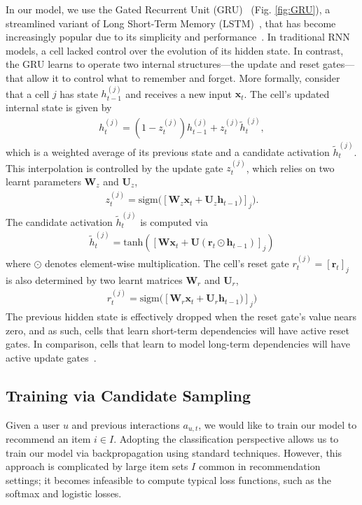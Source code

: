\documentclass{sig-alternate-05-2015}
\newcommand{\mat}[1]{\mathbf{#1}}
\begin{document}
In our model, we use the Gated Recurrent Unit (GRU)~\cite{Cho2014} (Fig. \ref{fig:GRU}), a streamlined variant of Long Short-Term Memory (LSTM)~\cite{Hochreiter1997}, that has become increasingly popular due to its simplicity and performance~\cite{jozefowicz2015empirical}. In traditional RNN models, a cell lacked control over the evolution of its hidden state. In contrast, the GRU learns to operate two internal structures---the update and reset gates---that allow it to control what to remember and forget. More formally, consider that a cell $j$ has state $h_{t-1}^{(j)}$ and receives a new input $\mathbf{x}_t$. The cell's updated internal state is given by
\begin{align}
	h_t^{(j)} = (1-z_t^{(j)})h^{(j)}_{t-1} + z_t^{(j)}\tilde{h}_{t}^{(j)},
\end{align}
which is a weighted average of its previous state and a  candidate activation $\tilde{h}_{t}^{(j)}$. This interpolation is controlled by the update gate $z_t^{(j)}$, which relies on two learnt parameters $\mat{W}_z$ and $\mat{U}_z$,
\begin{align}
	z_t^{(j)} = \textrm{sigm}\big([\mat{W}_z\mat{x}_{t} + \mat{U}_z\mat{h}_{t-1})]_j\big).
\end{align}
The candidate activation $\tilde{h}_{t}^{(j)}$ is computed via
\begin{align}
	\tilde{h}_{t}^{(j)} = \mathrm{tanh}([\mat{W}\mat{x}_t + \mat{U}(\mat{r}_t \odot \mat{h}_{t-1})]_j )
\end{align}
where $\odot$ denotes element-wise multiplication. The cell's reset gate $r^{(j)}_t = [\mat{r}_t]_j$ is also determined by two learnt matrices $\mat{W}_r$ and $\mat{U}_r$,
\begin{align}
	r^{(j)}_t = \textrm{sigm}\big([\mat{W}_r\mat{x}_{t} + \mat{U}_r\mat{h}_{t-1})]_j\big)
\end{align}
The previous hidden state is effectively dropped when the reset gate's value nears zero, and as such, cells that learn short-term dependencies will have active reset gates. In comparison, cells that learn to model long-term dependencies will have active update gates~\cite{Cho2014}. 

   
\subsection{Training via Candidate Sampling}
Given a user $u$ and previous interactions $a_{u,t}$, we would like to train our model to recommend an item $i \in I$. Adopting the classification perspective allows us to train our model via backpropagation using standard techniques. However, this approach is complicated by large item sets $I$ common in recommendation settings; it becomes infeasible to compute typical loss functions, such as the softmax and logistic losses. 
\end{document}
